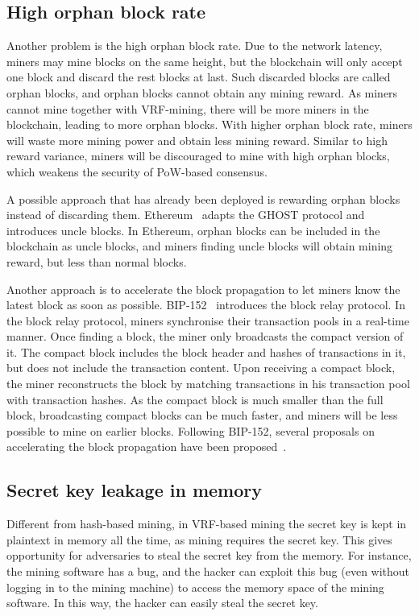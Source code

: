 \subsection{High orphan block rate}

Another problem is the high orphan block rate.
Due to the network latency, miners may mine blocks on the same height, but the blockchain will only accept one block and discard the rest blocks at last.
Such discarded blocks are called orphan blocks, and orphan blocks cannot obtain any mining reward.
As miners cannot mine together with VRF-mining, there will be more miners in the blockchain, leading to more orphan blocks.
With higher orphan block rate, miners will waste more mining power and obtain less mining reward.
Similar to high reward variance, miners will be discouraged to mine with high orphan blocks, which weakens the security of PoW-based consensus.

A possible approach that has already been deployed is rewarding orphan blocks instead of discarding them.
Ethereum~\cite{wood2014ethereum} adapts the GHOST protocol and introduces uncle blocks.
In Ethereum, orphan blocks can be included in the blockchain as uncle blocks, and miners finding uncle blocks will obtain mining reward, but less than normal blocks.

Another approach is to accelerate the block propagation to let miners know the latest block as soon as possible.
BIP-152~\cite{corallo2016bip} introduces the block relay protocol.
In the block relay protocol, miners synchronise their transaction pools in a real-time manner.
Once finding a block, the miner only broadcasts the compact version of it.
The compact block includes the block header and hashes of transactions in it, but does not include the transaction content.
Upon receiving a compact block, the miner reconstructs the block by matching transactions in his transaction pool with transaction hashes.
As the compact block is much smaller than the full block, broadcasting compact blocks can be much faster, and miners will be less possible to mine on earlier blocks.
Following BIP-152, several proposals on accelerating the block propagation have been proposed~\cite{ozisik2019graphene}\cite{klarman2018bloxroute}\cite{naumenko2019bandwidth}.

\subsection{Secret key leakage in memory}

Different from hash-based mining, in VRF-based mining the secret key is kept in plaintext in memory all the time, as mining requires the secret key. This gives opportunity for adversaries to steal the secret key from the memory. For instance, the mining software has a bug, and the hacker can exploit this bug (even without logging in to the mining machine) to access the memory space of the mining software. In this way, the hacker can easily steal the secret key.

